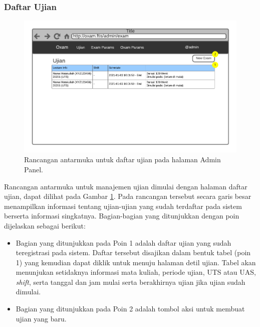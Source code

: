 \subsubsection{Daftar Ujian}
    \begin{figure}
        \centering
        \includegraphics{Gambar/mockups/Mockup--Admin - Exam Listing.pdf}
        \caption{Rancangan antarmuka untuk daftar ujian pada halaman Admin Panel.}
        \label{fig:mockup_admin_exam_listing}
    \end{figure}
    Rancangan antarmuka untuk manajemen ujian dimulai dengan halaman daftar
    ujian, dapat dilihat pada Gambar \ref{fig:mockup_admin_exam_listing}. Pada
    rancangan tersebut secara garis besar menampilkan informasi tentang
    ujian-ujian yang sudah terdaftar pada sistem berserta informasi singkatnya.
    Bagian-bagian yang ditunjukkan dengan poin dijelaskan sebagai berikut:
    \begin{itemize}
        \item Bagian yang ditunjukkan pada Poin 1 adalah daftar ujian yang sudah
            teregistrasi pada sistem. Daftar tersebut disajikan dalam bentuk
            tabel (poin 1) yang kemudian dapat diklik untuk menuju halaman detil
            ujian. Tabel akan menunjukan setidaknya informasi mata kuliah,
            periode ujian, UTS atau UAS, \textit{shift}, serta tanggal dan jam
            mulai serta berakhirnya ujian jika ujian sudah dimulai.
        
        \item Bagian yang ditunjukkan pada Poin 2 adalah tombol aksi untuk
            membuat ujian yang baru.
    \end{itemize}
    
